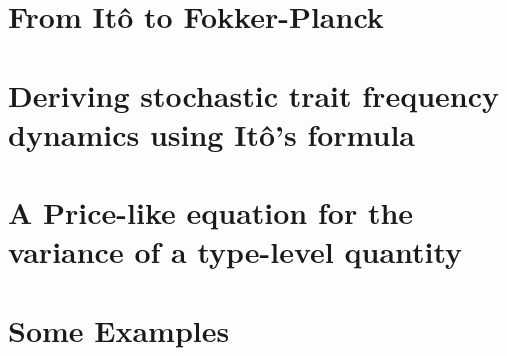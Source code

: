 \documentclass[twoside,12pt]{iiser-thesis-modified} %
\begin{document}
\fancyhead[CO]{  \rule[-4ex]{0pt}{4ex}\footnotesize\itshape{\chaptername~\thechapter: \nouppercase{\leftmark}}}


\chapter{From It\^{o} to Fokker-Planck}\label{App_SDE_FPE}

\chapter{Deriving stochastic trait frequency dynamics using It\^{o}'s formula}\label{App_density_to_freq}

\chapter{A Price-like equation for the variance of a type-level quantity}\label{App_stoch_var_eqns}

\chapter{Some Examples}\label{App_examples}



\fancyhead[CO]{\rule[-4ex]{0pt}{4ex}\footnotesize\itshape\nouppercase{\leftmark}}
\cleardoublepage
{}
\Huge\printbibheading
\renewcommand*{\bibfont}{\footnotesize}	
\printbibliography[heading=none]

\end{document}
